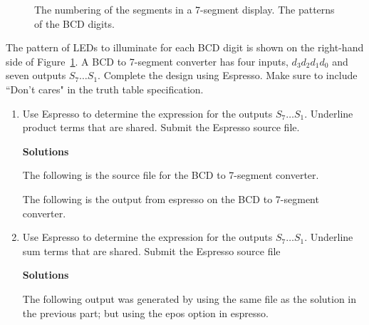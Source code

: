 \begin{enumerate}
            \begin{figure}[ht]
                \caption{The numbering of the segments in a 7-segment display.
                The patterns of the BCD digits.}
                \label{fig:BCD}
            \end{figure}

            The pattern of LEDs to illuminate for each BCD digit is shown on the
            right-hand side of Figure~\ref{fig:BCD}.  A BCD to 7-segment converter
            has four inputs, $d_3 d_2 d_1 d_0$ and seven outputs $S_7 \ldots S_1$.
            Complete the design using Espresso.  Make sure to include ``Don't cares"
            in the truth table specification.
            \begin{enumerate}
                \item Use Espresso to determine the \SOPmin expression for the outputs
                    $S_7 \ldots S_1$.  Underline product terms that are shared.
                    Submit the Espresso source file.

                    \begin{onlysolution} \textbf{Solutions} \itshape{
                            The following is the source file for the BCD to 7-segment converter.


                            The following is the output from espresso on the
                            BCD to 7-segment converter.

                        }
                    \end{onlysolution}

                \item Use Espresso to determine the \POSmin expression for the outputs
                    $S_7 \ldots S_1$.  Underline sum terms that are shared.
                    Submit the Espresso source file
                    \begin{onlysolution} \textbf{Solutions} \itshape {
                            The following output was generated by using the same file
                            as the solution in the previous part; but using the epos
                            option in espresso.

}
\end{onlysolution}
\end{enumerate}
\end{enumerate}
